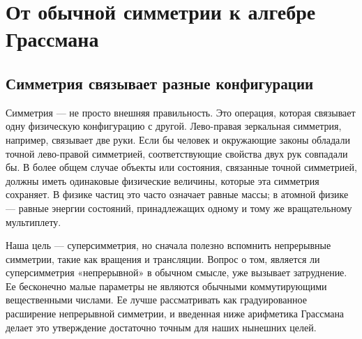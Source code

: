 \chapter{От обычной симметрии к алгебре Грассмана}


\section{Симметрия связывает разные конфигурации}

Симметрия — не просто внешняя правильность. Это операция, которая связывает одну физическую конфигурацию с другой. Лево-правая зеркальная симметрия, например, связывает две руки. Если бы человек и окружающие законы обладали точной лево-правой симметрией, соответствующие свойства двух рук совпадали бы. В более общем случае объекты или состояния, связанные точной симметрией, должны иметь одинаковые физические величины, которые эта симметрия сохраняет. В физике частиц это часто означает равные массы; в атомной физике — равные энергии состояний, принадлежащих одному и тому же вращательному мультиплету.

Наша цель — суперсимметрия, но сначала полезно вспомнить непрерывные симметрии, такие как вращения и трансляции. Вопрос о том, является ли суперсимметрия «непрерывной» в обычном смысле, уже вызывает затруднение. Ее бесконечно малые параметры не являются обычными коммутирующими вещественными числами. Ее лучше рассматривать как градуированное расширение непрерывной симметрии, и введенная ниже арифметика Грассмана делает это утверждение достаточно точным для наших нынешних целей. 

